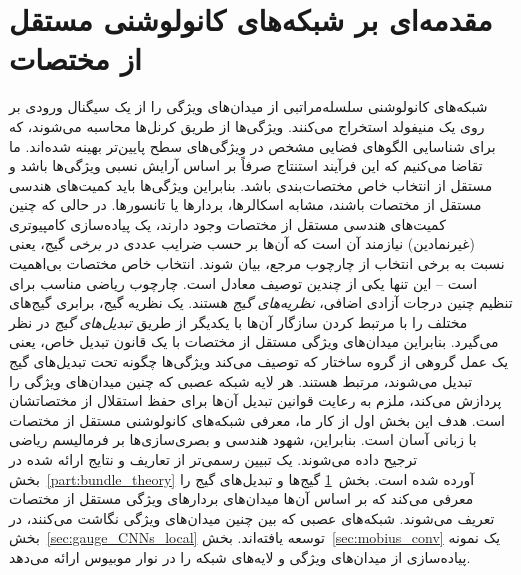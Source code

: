 \section{مقدمه‌ای بر شبکه‌های کانولوشنی مستقل از مختصات}
\label{sec:gauge_cnns_intro_local}
شبکه‌های کانولوشنی سلسله‌مراتبی از میدان‌های ویژگی را از یک سیگنال ورودی بر روی یک منیفولد استخراج می‌کنند.
ویژگی‌ها از طریق کرنل‌ها محاسبه می‌شوند، که برای شناسایی الگوهای فضایی مشخص در ویژگی‌های سطح پایین‌تر بهینه شده‌اند.
ما تقاضا می‌کنیم که این فرآیند استنتاج صرفاً بر اساس آرایش نسبی ویژگی‌ها باشد و مستقل از انتخاب خاص مختصات‌بندی باشد.
بنابراین ویژگی‌ها باید کمیت‌های هندسی مستقل از مختصات باشند، مشابه اسکالرها، بردارها یا تانسورها.
در حالی که چنین کمیت‌های هندسی مستقل از مختصات وجود دارند، یک پیاده‌سازی کامپیوتری (غیرنمادین) نیازمند آن است که آن‌ها بر حسب ضرایب عددی در \emph{برخی} گیج، یعنی نسبت به برخی انتخاب از چارچوب مرجع، بیان شوند.
انتخاب خاص مختصات بی‌اهمیت است -- این تنها یکی از چندین توصیف معادل است.
چارچوب ریاضی مناسب برای تنظیم چنین درجات آزادی اضافی، \emph{نظریه‌های گیج} هستند.
یک نظریه گیج، برابری گیج‌های مختلف را با مرتبط کردن سازگار آن‌ها با یکدیگر از طریق \emph{تبدیل‌های گیج} در نظر می‌گیرد.
بنابراین میدان‌های ویژگی مستقل از مختصات با یک قانون تبدیل خاص، یعنی یک عمل گروهی از گروه ساختار که توصیف می‌کند ویژگی‌ها چگونه تحت تبدیل‌های گیج تبدیل می‌شوند، مرتبط هستند.
هر لایه شبکه عصبی که چنین میدان‌های ویژگی را پردازش می‌کند، ملزم به رعایت قوانین تبدیل آن‌ها برای حفظ استقلال از مختصاتشان است.
هدف این بخش اول از کار ما، معرفی شبکه‌های کانولوشنی مستقل از مختصات با زبانی آسان است.
بنابراین، شهود هندسی و بصری‌سازی‌ها بر فرمالیسم ریاضی ترجیح داده می‌شوند.
یک تبیین رسمی‌تر از تعاریف و نتایج ارائه شده در بخش~\ref{part:bundle_theory} آورده شده است.
\etocsettocstyle{}{} %
\localtableofcontents
\vspace*{2.ex}
بخش~\ref{sec:gauge_cnns_intro_local} گیج‌ها و تبدیل‌های گیج را معرفی می‌کند که بر اساس آن‌ها میدان‌های بردارهای ویژگی مستقل از مختصات تعریف می‌شوند.
شبکه‌های عصبی که بین چنین میدان‌های ویژگی نگاشت می‌کنند، در بخش~\ref{sec:gauge_CNNs_local} توسعه یافته‌اند.
بخش~\ref{sec:mobius_conv} یک نمونه پیاده‌سازی از میدان‌های ویژگی و لایه‌های شبکه را در نوار موبیوس ارائه می‌دهد.